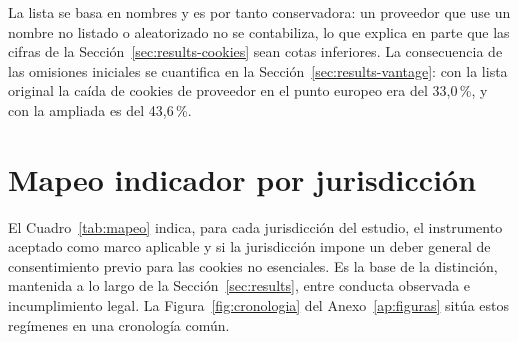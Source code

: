\documentclass[pdflatex,sn-basic,Numbered]{sn-jnl}
\theoremstyle{thmstyleone}
\theoremstyle{thmstyletwo}
\theoremstyle{thmstylethree}
\begin{document}
\begin{appendices}
La lista se basa en nombres y es por tanto conservadora: un proveedor que use un nombre no listado o aleatorizado no se contabiliza, lo que explica en parte que las cifras de la Secci\'on~\ref{sec:results-cookies} sean cotas inferiores. La consecuencia de las omisiones iniciales se cuantifica en la Secci\'on~\ref{sec:results-vantage}: con la lista original la ca\'ida de cookies de proveedor en el punto europeo era del 33,0\,\%, y con la ampliada es del 43,6\,\%.

\section{Mapeo indicador por jurisdicci\'on}\label{ap:mapeo}
\setcounter{table}{0}\setcounter{figure}{0}

El Cuadro~\ref{tab:mapeo} indica, para cada jurisdicci\'on del estudio, el instrumento aceptado como marco aplicable y si la jurisdicci\'on impone un deber general de consentimiento previo para las cookies no esenciales. Es la base de la distinci\'on, mantenida a lo largo de la Secci\'on~\ref{sec:results}, entre conducta observada e incumplimiento legal. La Figura~\ref{fig:cronologia} del Anexo~\ref{ap:figuras} sit\'ua estos reg\'imenes en una cronolog\'ia com\'un.


\end{appendices}
\end{document}
